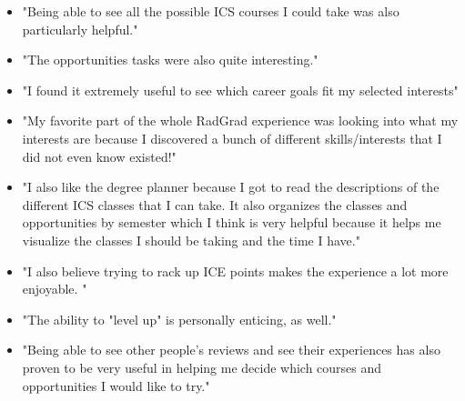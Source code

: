 \documentclass[acmsmall,nonacm]{acmart}
\begin{document}
\begin{itemize}
\item "Being able to see all the possible ICS courses I could take was also particularly helpful."
\end{itemize}

\begin{itemize}
\item "The opportunities tasks were also quite interesting."
\end{itemize}

\begin{itemize}
\item "I found it extremely useful to see which career goals fit my selected interests"
\end{itemize}

\begin{itemize}
\item "My favorite part of the whole RadGrad experience was looking into what my interests are because I discovered a bunch of different skills/interests that I did not even know existed!"
\end{itemize}

\begin{itemize}
\item "I also like the degree planner because I got to read the descriptions of the different ICS classes that I can take. It also organizes the classes and opportunities by semester which I think is very helpful because it helps me visualize the classes I should be taking and the time I have."
\end{itemize}

\begin{itemize}
\item "I also believe trying to rack up ICE points makes the experience a lot more enjoyable. "
\item "The ability to "level up" is personally enticing, as well."
\end{itemize}

\begin{itemize}
\item "Being able to see other people’s reviews and see their experiences has also proven to be very useful in helping me decide which courses and opportunities I would like to try."
\end{itemize}
\end{document}

